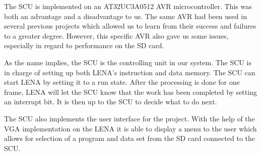 The \acf{SCU} is implemented on an AT32UC3A0512 AVR microcontroller. This was both an advantage and a disadvantage to us. The same AVR had been used in several previous projects which allowed us to learn from their success and failures to a greater degree. However, this specific AVR also gave us some issues, especially in regard to performance on the \ac{SD} card.

As the name implies, the \ac{SCU} is the controlling unit in
our system. The \ac{SCU} is in charge of setting up both \ac{LENA}'s instruction
and data memory. The \ac{SCU} can start \ac{LENA} by setting it to a run state. 
After the processing is done for one frame, \ac{LENA} will let the \ac{SCU} know
that the work has been completed by setting an interrupt bit. It is then up to
the \ac{SCU} to decide what to do next.

The \ac{SCU} also implements the user interface for the project. With the help
of the \ac{VGA} implementation on the \ac{LENA} it is able to display a menu to
the user which allows for selection of a program and data set from the \ac{SD}
card connected to the \ac{SCU}.
